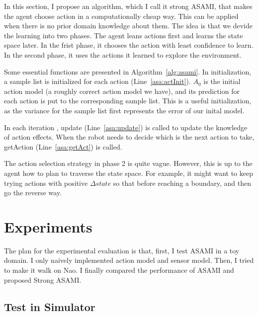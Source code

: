 \documentclass[10pt]{IEEEtran}
\begin{document}
In this section, I propose an algorithm, which I call it strong ASAMI,
that makes the agent choose action in a computationally cheap way.
This can be applied when there is no prior domain knowledge about
them. The idea is that we devide the learning into two phases. The
agent leans actions first and learns the state space later. In the
frist phase, it chooses the action with least confidence to learn. In
the second phase, it uses the actions it learned to explore the
environment.

Some essential functions are presented in Algorithm~\ref{alg:asami}.
In initialization, a sample list is initialized for each action
(Line~\ref{asa:actInit}). $A_0$ is the initial action model (a roughly
correct action model we have), and its prediction for each action is
put to the corresponding sample list.  This is a useful
initialization, as the variance for the sample list first represents
the error of our inital model.

In each iteration , update (Line~\ref{asa:update}) is called to update
the knowledge of action effects. When the robot needs to decide which
is the next action to take, getAction (Line~\ref{asa:getAct}) is
called.

The action selection strategy in phase 2 is quite vague. However, this
is up to the agent how to plan to traverse the state space. For
example, it might want to keep trying actions with positive $\Delta
state$ so that before reaching a boundary, and then go the
reverse way.

\section{Experiments}

The plan for the experimental evaluation is that, first, I test ASAMI
in a toy domain. I only naively implemented action model and sensor
model. Then, I tried to make it walk on Nao. I finally compared the
performance of ASAMI and proposed Strong ASAMI.

\subsection{Test in Simulator}
\end{document}
